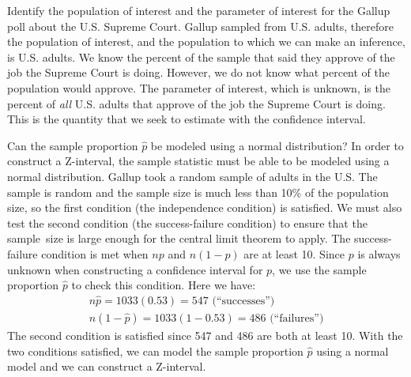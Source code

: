 \begin{examplewrap}
\begin{nexample}{Identify the population of interest and the parameter of interest for the Gallup poll about the U.S. Supreme Court. }
Gallup sampled from U.S. adults, therefore the population of interest, and the population to which we can make an inference, is U.S. adults.  We know the percent of the sample that said they approve of the job the Supreme Court is doing.  However, we do not know what percent of the population would approve.  The parameter of interest, which is unknown, is the percent of \emph{all} U.S. adults that approve of the job the Supreme Court is doing.  This is the quantity that we seek to estimate with the confidence interval.
\end{nexample}
\end{examplewrap}


\begin{examplewrap}
\begin{nexample}{Can the sample proportion $\hat{p}$ be modeled using a normal distribution?}
In order to construct a Z-interval, the sample statistic must be able to be modeled using a normal distribution.  Gallup took a random sample of adults in the U.S.  The sample is random and the sample size is much less than 10\% of the population size, so the first condition (the independence condition) is satisfied.  We must also test the second condition (the success-failure condition) to ensure that the sample~size is large enough for the central limit theorem to apply.  The success-failure condition is met when $np$ and $n(1-p)$ are at least 10. Since $p$ is always unknown when constructing a confidence interval for $p$, we use the sample proportion $\hat{p}$ to check this condition.  Here we have:
\begin{align*}
n\hat{p} = 1033(0.53) = 547\text{ (``successes'')} \\
 n(1-\hat{p}) = 1033(1 - 0.53) = 486\text{ (``failures'')}
\end{align*}
The second condition is satisfied since 547 and 486 are both at least 10. With the two conditions satisfied, we can model the sample proportion $\hat{p}$ using a normal model and we can construct a Z-interval.
\end{nexample}
\end{examplewrap}

\D{\newpage}

